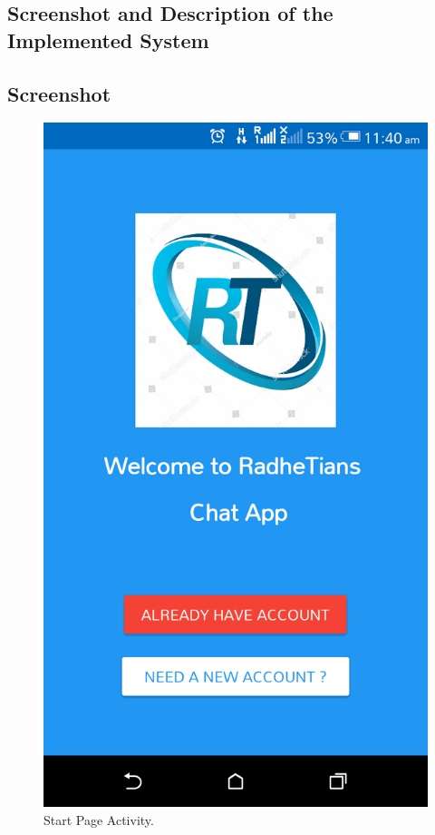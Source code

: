 \begin{appendices}
\chapter{Screenshot and Description of the Implemented System}
\section{Screenshot}

\begin{figure}[!ht]
	\centering
	\includegraphics[scale=0.17]{start.png}
	\caption{\label{img18}  Start Page Activity.}
\end{figure}


\end{appendices}
